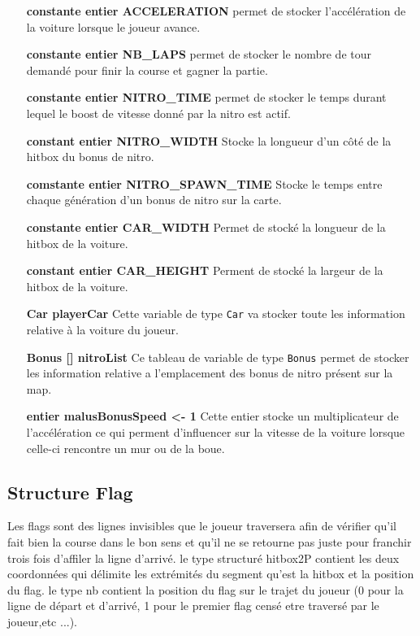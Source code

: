 \documentclass[11pt]{report}
\renewcommand{\tt}[1]{\texttt{#1}}
\begin{document}
\begin{itemize}
  \item [\textbf{constante entier ACCELERATION}]permet de stocker l'accélération de la voiture lorsque le joueur avance.
  \item [\textbf{constante entier NB\_LAPS}]permet de stocker le nombre de tour demandé pour finir la course et gagner la partie.
  \item[\textbf{constante entier NITRO\_TIME}]permet de stocker le temps durant lequel le boost de vitesse donné par la nitro est actif.
  \item[\textbf{constant entier NITRO\_WIDTH}]Stocke la longueur d'un côté de la hitbox du bonus de nitro.
  \item[\textbf{comstante entier NITRO\_SPAWN\_TIME}]Stocke le temps entre chaque génération d'un bonus de nitro sur la carte.
  \item[\textbf{constante entier CAR\_WIDTH}]Permet de stocké la longueur de la hitbox de la voiture.
  \item[\textbf{constant entier CAR\_HEIGHT}]Perment de stocké la largeur de la hitbox de la voiture.
  \item[\textbf{Car playerCar}]Cette variable de type \tt{Car} va stocker toute les information relative à la voiture du joueur.
  \item[\textbf{Bonus [] nitroList}]Ce tableau de variable de type \tt{Bonus} permet de stocker les information relative a l'emplacement des bonus de nitro présent sur la map.
  \item[\textbf{entier malusBonusSpeed <- 1}]Cette entier stocke un multiplicateur de l'accélération ce qui perment d'influencer sur la vitesse de la voiture lorsque celle-ci rencontre un mur ou de la boue.
\end{itemize}

\subsection{Structure Flag}



Les flags sont des lignes invisibles que le joueur traversera afin de vérifier qu'il fait bien la course dans le bon sens et qu'il ne se retourne pas juste pour franchir trois fois d'affiler la ligne d'arrivé. le type structuré hitbox2P contient les deux coordonnées qui délimite les extrémités du segment qu'est la hitbox et la position du flag. le type nb contient la position du flag sur le trajet du joueur (0 pour la ligne de départ et d'arrivé, 1 pour le premier flag censé etre traversé par le joueur,etc ...).
\end{document}
